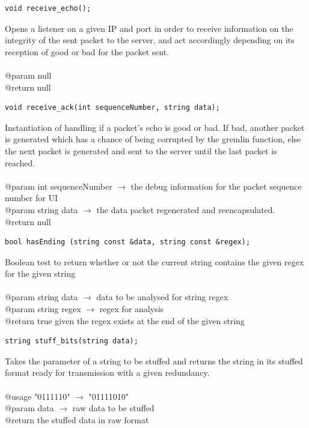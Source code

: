 \documentclass[12pt]{article}
\begin{document}
\begin{lstlisting}
void receive_echo();
\end{lstlisting}
Opens a listener on a given IP and port in order to receive information on the integrity of the sent packet to the server, and act accordingly depending on its reception of good or bad for the packet sent.\\\\
@param null\\
@return null

\begin{lstlisting}
void receive_ack(int sequenceNumber, string data);
\end{lstlisting}
Instantiation of handling if a packet's echo is good or bad. If bad, another packet is generated which has a chance of being corrupted by the gremlin function, else the next packet is generated and sent to the server until the last packet is reached.\\\\
@param int sequenceNumber $\rightarrow$ the debug information for the packet sequence number for UI\\
@param string data $\rightarrow$ the data packet regenerated and reencapsulated.\\
@return null

\begin{lstlisting}
bool hasEnding (string const &data, string const &regex);
\end{lstlisting}
Boolean test to return whether or not the current string contains the given regex for the given string\\\\
@param string data $\rightarrow$ data to be analysed for string regex\\
@param string regex $\rightarrow$ regex for analysis\\
@return true given the regex exists at the end of the given string

\begin{lstlisting}
string stuff_bits(string data);
\end{lstlisting}
Takes the parameter of a string to be stuffed and returns the string in its stuffed format ready for transmission with a given redundancy.\\\\
@usage "0111110" $\rightarrow$ "01111010"\\
@param data $\rightarrow$ raw data to be stuffed\\
@return the stuffed data in raw format
\end{document}
